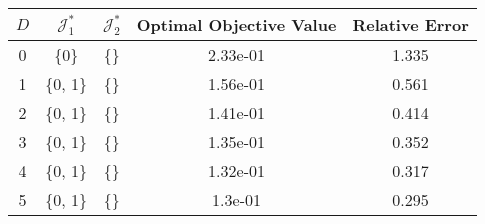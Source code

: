 \begin{subtable}{\textwidth}
\centering
\begin{tabular}{|c|c|c|c|c|}
  \hline
$D$ & $\mathcal J_1^*$ & $\mathcal J_2^*$ & Optimal Objective Value & Relative Error \\ 
  \hline
0 & \{0\} & \{\} & 2.33e-01 & 1.335 \\ 
  1 & \{0, 1\} & \{\} & 1.56e-01 & 0.561 \\ 
  2 & \{0, 1\} & \{\} & 1.41e-01 & 0.414 \\ 
  3 & \{0, 1\} & \{\} & 1.35e-01 & 0.352 \\ 
  4 & \{0, 1\} & \{\} & 1.32e-01 & 0.317 \\ 
  5 & \{0, 1\} & \{\} & 1.3e-01 & 0.295 \\ 
   \hline
\end{tabular}
\end{subtable}
